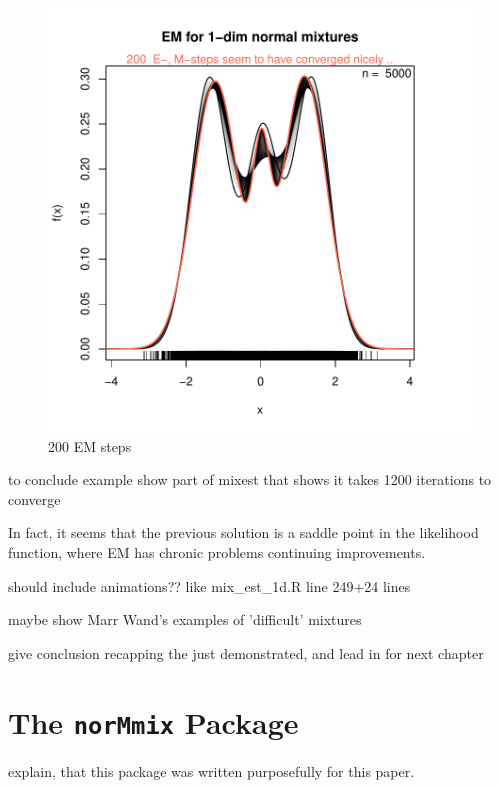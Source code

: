 \begin{figure}
    \begin{center}
\includegraphics{chapter1-004}
    \end{center}
    \caption{200 EM steps}
    \label{adfafdafds}
\end{figure}

to conclude example show part of mixest that shows it takes 1200 iterations to converge

In fact, it seems that the previous solution is a saddle point in the likelihood function, where EM has chronic problems continuing improvements.

should include animations?? like mix\_est\_1d.R line 249+24 lines

maybe show Marr Wand's examples of 'difficult' mixtures

give conclusion recapping the just demonstrated, and lead in for next chapter






\chapter{The {\tt norMmix} Package}

explain, that this package was written purposefully for this paper.

